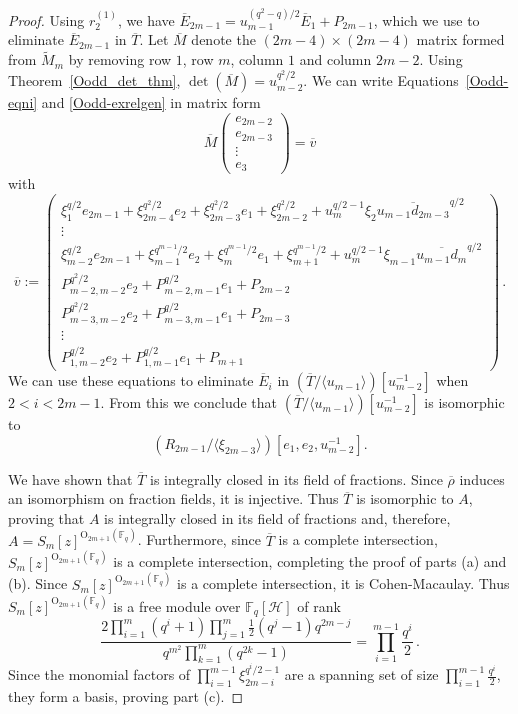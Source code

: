 \documentclass{amsart}
\newcommand{\field}{\mathbb{F}}
\newcommand{\orth}[2]{{{\text{O}_{{#1}}(\field_{#2})}}}
\renewcommand{\H}{\mathcal{H}}
\begin{document}
\begin{proof}
Using $r_2^{(1)}$, we have $\overline{E}_{2m-1}=u_{m-1}^{(q^2-q)/2}\overline{E}_1+P_{2m-1}$, which we use to eliminate $\overline{E}_{2m-1}$ in $\overline{T}$.
Let $\overline{M}$ denote the $(2m-4)\times(2m-4)$ matrix formed from $\widetilde{M}_m$ by removing row $1$, row $m$, column $1$ and column $2m-2$.
Using Theorem~\ref{Oodd_det_thm}, $\det(\overline{M})=u_{m-2}^{q^2/2}$.
We can write Equations~\ref{Oodd-eqni} and \ref{Oodd-exrelgen} in matrix form 
$$\overline{M}\begin{pmatrix} e_{2m-2}\\e_{2m-3} \\ \vdots\\ e_3 \end{pmatrix} =\overline{v}$$
with
    $$
        \overline{v}:=\begin{pmatrix} \xi_1^{q/2}e_{2m-1}+\xi_{2m-4}^{q^2/2}e_2
        +\xi_{2m-3}^{q^2/2}e_1+\xi_{2m-2}^{q^2/2}+u_m^{q/2-1}\xi_2\overline{u_{m-1}d_{2m-3}}^{q/2} \\ 
        \vdots\\
        \xi_{m-2}^{q/2}e_{2m-1}+\xi_{m-1}^{q^{m-1}/2}e_2
        +\xi_m^{q^{m-1}/2}e_1+\xi_{m+1}^{q^{m-1}/2}+u_m^{q/2-1}\xi_{m-1}\overline{u_{m-1}d_m}^{q/2} \\ 
        P^{q^2/2}_{m-2,m-2}e_2+P^{q/2}_{m-2,m-1} e_1+P_{2m-2}\\
        P^{q^2/2}_{m-3,m-2}e_2+P^{q/2}_{m-3,m-1} e_1+P_{2m-3}\\
        \vdots\\
        P_{1,m-2}^{q/2} e_2+P_{1,m-1}^{q/2} e_1+P_{m+1}\end{pmatrix}\, .
    $$
We can use these equations to eliminate $\overline{E}_i$ in $(\overline{T}/\langle u_{m-1}\rangle)[u_{m-2}^{-1}]$ when $2<i<2m-1$.
From this we conclude that $(\overline{T}/\langle u_{m-1}\rangle)[u_{m-2}^{-1}]$ is isomorphic to $$(R_{2m-1}/\langle \xi_{2m-3}\rangle)[e_1,e_2,u_{m-2}^{-1}].$$

We have shown that $\overline{T}$ is integrally closed in its field of fractions.
Since $\overline{\rho}$ induces an isomorphism on fraction fields, it is injective.
Thus $\overline{T}$ is isomorphic to $A$, proving that $A$ is integrally closed in its field of fractions and, therefore,
 $A=S_m[z]^{\orth{2m+1}{q}}$. Furthermore, since $\overline{T}$ is a complete intersection, $S_m[z]^{\orth{2m+1}{q}}$ is a complete intersection,
 completing the proof of parts (a) and (b). Since $S_m[z]^{\orth{2m+1}{q}}$ is a complete intersection, it is Cohen-Macaulay. Thus 
 $S_m[z]^{\orth{2m+1}{q}}$  is a free module over $\field_q[\H]$ of rank
    $$
        \frac{2\prod_{i=1}^m(q^i+1)\prod_{j=1}^m\frac{1}{2}(q^j-1)q^{2m-j}}{q^{m^2}\prod_{k=1}^m(q^{2k}-1)}=\prod_{i=1}^{m-1}\frac{q^i}{2}\, .
    $$
Since the monomial factors of $\prod_{i=1}^{m-1} \xi_{2m-i}^{q^i/2-1}$ are a spanning set of size $\prod_{i=1}^{m-1}\frac{q^i}{2}$, they form a basis, proving part (c).
\end{proof} 
\end{document}
